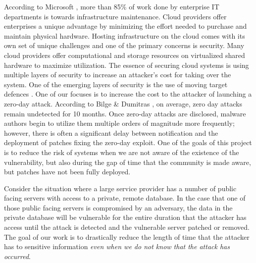 \documentclass[a4paper,twoside]{article}
\begin{document}
According to Microsoft \cite{harms_economics_2010}, more than 85\% of work done by enterprise IT departments is towards infrastructure maintenance. Cloud providers offer enterprises a unique advantage by minimizing the effort needed to purchase and maintain physical hardware.  %
Hosting infrastructure on the cloud comes with its own set of unique challenges and one of the primary concerns is security. Many cloud providers offer computational and storage resources on virtualized shared hardware to maximize utilization. The essence of securing cloud systems is using multiple layers \cite{panwar_layered_2011} of security to increase an attacker's cost for taking over the system. One of the emerging layers of security is the use of moving target defences \cite{evans_effectiveness_2011}.  
One of our focuses is to increase the cost to the attacker of launching a zero-day attack. According to Bilge \& Dumitras \cite{bilge_before_2012}, on average, zero day attacks remain undetected for 10 months. Once zero-day attacks are disclosed, malware authors begin to utilize them multiple orders of magnitude more frequently; however, there is often a significant delay between notification and the deployment of patches fixing the zero-day exploit. One of the goals of this project is to reduce the risk of systems when we are not aware of the existence of the vulnerability, but also during the gap of time that the community is made aware, but patches have not been fully deployed.


Consider the situation where a large service provider has a number of public facing servers with access to a private, remote database.  In the case that one of those public facing servers is compromised by an adversary, the data in the private database will be vulnerable for the entire duration that the attacker has access until the attack is detected and the vulnerable server patched or removed.  The goal of our work is to drastically reduce the length of time that the attacker has to sensitive information \textit{even when we do not know that the attack has occurred}. 
\end{document}
